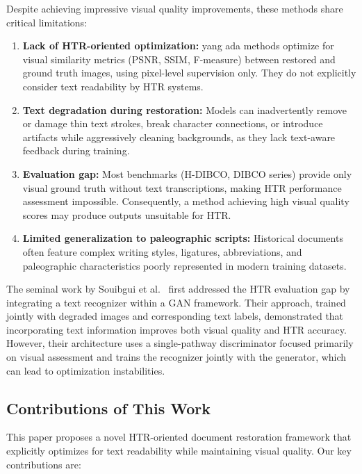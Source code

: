 \documentclass[journal]{IEEEtran}
\begin{document}
Despite achieving impressive visual quality improvements, these methods share critical limitations:

\begin{enumerate}
    \item \textbf{Lack of HTR-oriented optimization:} yang ada methods optimize for visual similarity metrics (PSNR, SSIM, F-measure) between restored and ground truth images, using pixel-level supervision only. They do not explicitly consider text readability by HTR systems.
    
    \item \textbf{Text degradation during restoration:} Models can inadvertently remove or damage thin text strokes, break character connections, or introduce artifacts while aggressively cleaning backgrounds, as they lack text-aware feedback during training.
    
    \item \textbf{Evaluation gap:} Most benchmarks (H-DIBCO, DIBCO series) provide only visual ground truth without text transcriptions, making HTR performance assessment impossible. Consequently, a method achieving high visual quality scores may produce outputs unsuitable for HTR.
    
    \item \textbf{Limited generalization to paleographic scripts:} Historical documents often feature complex writing styles, ligatures, abbreviations, and paleographic characteristics poorly represented in modern training datasets.
\end{enumerate}

The seminal work by Souibgui et al.~\cite{souibgui2021enhance} first addressed the HTR evaluation gap by integrating a text recognizer within a GAN framework. Their approach, trained jointly with degraded images and corresponding text labels, demonstrated that incorporating text information improves both visual quality and HTR accuracy. However, their architecture uses a single-pathway discriminator focused primarily on visual assessment and trains the recognizer jointly with the generator, which can lead to optimization instabilities.

\subsection{Contributions of This Work}

This paper proposes a novel HTR-oriented document restoration framework that explicitly optimizes for text readability while maintaining visual quality. Our key contributions are:
\end{document}
